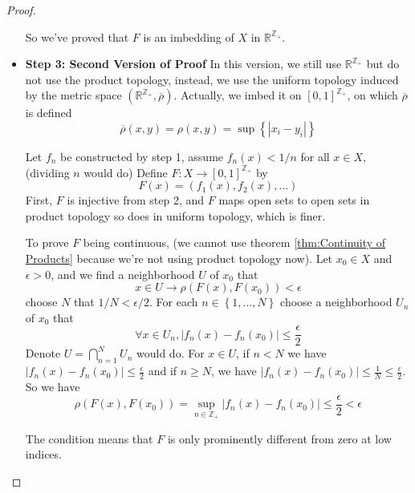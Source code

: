 \documentclass[../main.tex]{subfiles}
\begin{document}
\begin{proof}
\begin{itemize}
		So we've proved that $F$ is an imbedding of $X$ in $\mathbb{R}^{\mathbb{Z}_+}$.
	\item \textbf{Step 3: Second Version of Proof} In this version, we still use $\mathbb{R}^{\mathbb{Z}_+}$ but do not use the product topology, instead, we use the uniform topology induced by the metric space $(\mathbb{R}^{\mathbb{Z}_+}, \overline{\rho})$. Actually, we imbed it on $[0,1]^{\mathbb{Z}_+}$, on which $\overline{\rho}$ is defined
		\begin{equation*}
			\overline{\rho}(x,y) = \rho(x,y) = \sup \left\{ \left|x_i-y_i\right| \right\}
		\end{equation*}

		Let $f_n$ be constructed by step 1, assume $f_n(x) < 1 / n$ for all $x\in X$, (dividing $n$ would do) Define $F: X \rightarrow [0,1]^{\mathbb{Z}_+}$ by
		\begin{equation*}
			F(x) = (f_1(x), f_2(x), \ldots )
		\end{equation*}
		First, $F$ is injective from step 2, and $F$ maps open sets to open sets in product topology so does in uniform topology, which is finer.

		To prove $F$ being continuous, (we cannot use theorem \ref{thm:Continuity of Products} because we're not using product topology now). Let $x_0\in X$ and $\epsilon>0$, and we find a neighborhood $U$ of $x_0$ that
		\begin{equation*}
			x\in U \rightarrow \rho(F(x),F(x_0)) < \epsilon
		\end{equation*}
		choose $N$ that $1 / N < \epsilon / 2$. For each $n\in \left\{ 1, \ldots ,N \right\}$ choose a neighborhood $U_n$ of $x_0$ that
		\begin{equation*}
			\forall x\in U_n, \left|f_n(x)-f_n(x_0)\right| \leq \frac{\epsilon}{2}
		\end{equation*}
		Denote $U = \bigcap_{n=1}^{N} U_n$ would do. For $x\in U$, if $n<N$ we have $\left|f_n(x)-f_n(x_0)\right|\leq \frac{\epsilon}{2}$ and if $n\geq N$, we have $\left|f_n(x)-f_n(x_0)\right|\leq \frac{1}{N} \leq \frac{\epsilon}{2}$. So we have
		\begin{equation*}
			\rho(F(x),F(x_0)) = \sup_{n\in \mathbb{Z}_+} \left|f_n(x)-f_n(x_0)\right| \leq \frac{\epsilon}{2} < \epsilon
		\end{equation*}
		\begin{remark}
			The condition means that $F$ is only prominently different from zero at low indices.
		\end{remark}
\end{itemize}
\end{proof}
\end{document}
